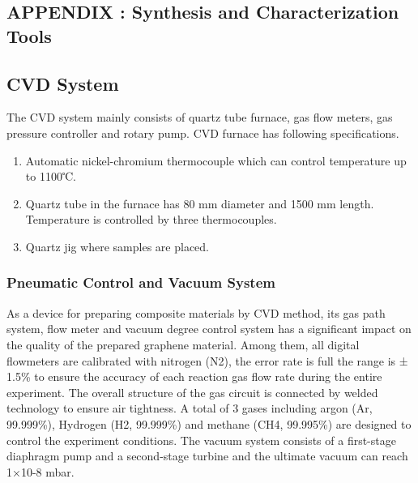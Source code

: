 

\begin{center}
	\section*{APPENDIX \thesection : Synthesis and Characterization Tools}	
\end{center}


\subsection{CVD System}

The CVD system mainly consists of quartz tube furnace, gas flow meters, gas pressure controller and rotary pump.
CVD furnace has following specifications.
\begin{enumerate}
\item Automatic nickel-chromium thermocouple which can control temperature up to 1100℃.
\item Quartz tube in the furnace has 80 mm diameter and 1500 mm length. Temperature is controlled by three thermocouples.%
\item Quartz jig where samples are placed.
\end{enumerate}

\subsubsection{Pneumatic Control and Vacuum System}

As a device for preparing composite materials by CVD method, its gas path system, flow meter and vacuum degree control system has a significant impact on the quality of the prepared graphene material. Among them, all digital flowmeters are calibrated with nitrogen (N2), the error rate is full the range is ± 1.5\% to ensure the accuracy of each reaction gas flow rate during the entire experiment. The overall structure of the gas circuit is connected by welded technology to ensure air tightness. A total of 3 gases including argon (Ar, 99.999\%), Hydrogen (H2, 99.999\%) and methane (CH4, 99.995\%) are designed to control the experiment conditions. The vacuum system consists of a first-stage diaphragm pump and a second-stage turbine and the ultimate vacuum can reach 1×10-8 mbar.

